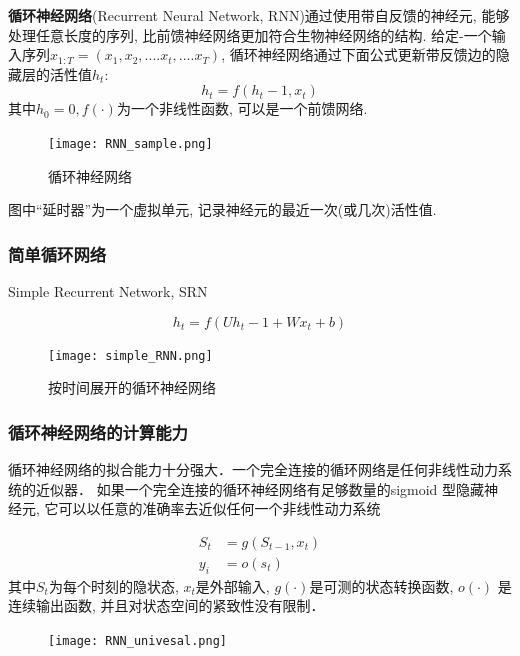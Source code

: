 \textbf{循环神经网络}(Recurrent Neural Network, RNN)通过使用带自反馈的神经元, 能够处理任意长度的序列, 比前馈神经网络更加符合生物神经网络的结构.
给定-一个输入序列$x_{1:T} =(x_1, x_2,  .... x_t, .... x_T)$, 循环神经网络通过下面公式更新带反馈边的隐藏层的活性值$h_t$:
$$h_t= f(h_t-1, x_t)$$
其中$h_0= 0, f( \cdot )$为一个非线性函数, 可以是一个前馈网络.
\begin{figure}[!htb]
    \center
\texttt{[image: RNN\_sample.png]}
\caption{循环神经网络}
\end{figure}


图中“延时器”为一个虚拟单元, 记录神经元的最近一次(或几次)活性值.
\subsubsection{简单循环网络}
Simple Recurrent Network, SRN \citep{elman1990finding} 
 
$$h_t = f(Uh_t-1 +Wx_t + b)$$
\begin{figure}[!htb]
    \center
\texttt{[image: simple\_RNN.png]}
\caption{按时间展开的循环神经网络}
\end{figure}


\subsubsection{循环神经网络的计算能力}
循环神经网络的拟合能力十分强大．一个完全连接的循环网络是任何非线性动力系统的近似器．
如果一个完全连接的循环神经网络有足够数量的sigmoid 型隐藏神经元, 它可以以任意的准确率去近似任何一个非线性动力系统

\begin{equation*}
    \begin{split}
        S_t &= g(S_{t-1}, x_t) \\
        y_i & = o(s_t)
    \end{split}
\end{equation*}
其中$S_t$为每个时刻的隐状态, $x_t$是外部输入, $g(\cdot)$是可测的状态转换函数, 
$o(\cdot)$ 是连续输出函数, 并且对状态空间的紧致性没有限制．
 
\begin{figure}[!htb]
    \center
\texttt{[image: RNN\_univesal.png]}
\end{figure}





